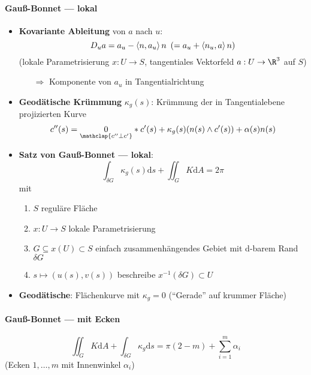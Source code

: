 \paragraph{Gauß-Bonnet --- lokal}
\begin{itemize}
  \item \textbf{Kovariante Ableitung} von \( a \) nach \( u \):
  \begin{equation*}
    D_u a = a_u - \left\langle n,a_u \right\rangle n \enskip (= a_u + \left\langle n_u, a \right\rangle n)
  \end{equation*}
  (lokale Parametrisierung \( x: U \to S \), tangentiales Vektorfeld \( a: U \to \R^3 \) auf \( S \))
  \begin{itemize}
    \item[\( \Rightarrow \)] Komponente von \( a_u \) in Tangentialrichtung
  \end{itemize}
  \item \textbf{Geodätische Krümmung} \( \kappa_g(s) \): Krümmung der in Tangentialebene projizierten Kurve
  \begin{equation*}
    c''(s) = \underset{\mathclap{c'' \perp c'}}{0}*c'(s) + \kappa_g(s)(n(s) \wedge c'(s)) + \alpha(s)n(s) 
  \end{equation*}
  \item \textbf{Satz von Gauß-Bonnet --- lokal}:
  \begin{equation*}
    \int_{\delta G} \kappa_g(s)\text{d}s + \iint_G K\text{d}A = 2\pi
  \end{equation*}
  mit
  \begin{enumerate}
    \item \( S \) reguläre Fläche
    \item \( x: U \to S \) lokale Parametrisierung
    \item \( G \subseteq x(U) \subset S \) einfach zusammenhängendes Gebiet mit d-barem Rand \( \delta G \)
    \item \( s \mapsto (u(s),v(s)) \) beschreibe \( x^{-1}(\delta G) \subset U \)
  \end{enumerate}
  \item \textbf{Geodätische}: Flächenkurve mit \( \kappa_g = 0 \) (``Gerade'' auf krummer Fläche)
\end{itemize}

\paragraph{Gauß-Bonnet --- mit Ecken}
\begin{equation*}
  \iint_G K\text{d}A + \int_{\delta G} \kappa_g \text{d}s = \pi(2-m)+\sum_{i=1}^m \alpha_i
\end{equation*}
(Ecken \( 1,\dots,m \) mit Innenwinkel \( \alpha_i \))

